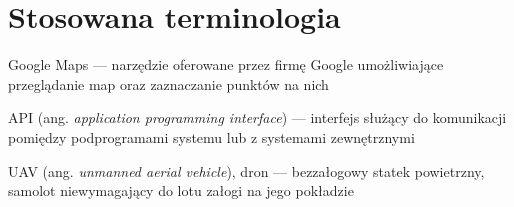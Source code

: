 \chapter{Stosowana terminologia}
\label{chap:terminology}

\begin{description}
   \item Google Maps --- narzędzie oferowane przez firmę Google umożliwiające przeglądanie map oraz zaznaczanie punktów na nich 
   \item API (ang. \textit{application programming interface}) --- interfejs służący do komunikacji pomiędzy podprogramami systemu lub z systemami zewnętrznymi
   \item UAV (ang. \textit{unmanned aerial vehicle}), dron --- bezzałogowy statek powietrzny, samolot niewymagający do lotu załogi na jego pokładzie
\end{description}